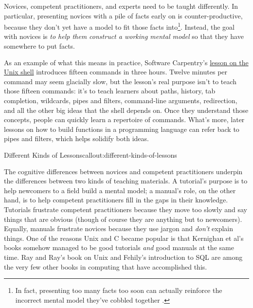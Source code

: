 Novices, competent practitioners, and experts need to be taught
differently.  In particular, presenting novices with a pile of facts
early on is counter-productive, because they don't yet have a model to
fit those facts into\footnote{In fact, presenting too many facts too
soon can actually reinforce the incorrect mental model they've cobbled
together \cite{}.}. Instead, the goal with novices is \emph{to help
them construct a working mental model} so that they have somewhere to
put facts.

As an example of what this means in practice, Software Carpentry's
\href{http://swcarpentry.github.io/shell-novice/}{lesson on the Unix
shell} introduces fifteen commands in three hours. Twelve minutes per
command may seem glacially slow, but the lesson's real purpose isn't
to teach those fifteen commands: it's to teach learners about paths,
history, tab completion, wildcards, pipes and filters, command-line
arguments, redirection, and all the other big ideas that the shell
depends on.  Once they understand those concepts, people can quickly
learn a repertoire of commands.  What's more, later lessons on how to
build functions in a programming language can refer back to pipes and
filters, which helps solidify both ideas.

\begin{callout}{Different Kinds of Lessons}{callout:different-kinds-of-lessons}

The cognitive differences between novices and competent practitioners
underpin the differences between two kinds of teaching materials. A
tutorial's purpose is to help newcomers to a field build a mental model;
a manual's role, on the other hand, is to help competent practitioners
fill in the gaps in their knowledge. Tutorials frustrate competent
practitioners because they move too slowly and say things that are
obvious (though of course they are anything but to newcomers). Equally,
manuals frustrate novices because they use jargon and \emph{don't}
explain things. One of the reasons Unix and C became popular is that
Kernighan et al's books \cite{fixme} somehow managed to be good tutorials
\emph{and} good manuals at the same time. Ray and Ray's book on Unix \cite{fixme}
and Fehily's introduction to SQL \cite{fixme} are among the very few
other books in computing that have accomplished this.

\end{callout}


